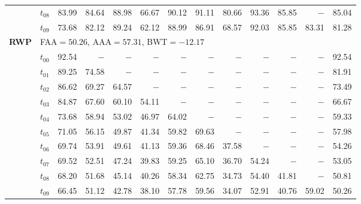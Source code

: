 \begin{table}[ht]
\begin{tabular}{@{}l l r r r r r r r r r r r@{}}
 & $t_{08}$ & 83.99 & 84.64 & 88.98 & 66.67 & 90.12 & 91.11 & 80.66 & 93.36 & 85.85 & $-$ & 85.04 \\
 & $t_{09}$ & 73.68 & 82.12 & 89.24 & 62.12 & 88.99 & 86.91 & 68.57 & 92.03 & 85.85 & 83.31 & 81.28 \\
\midrule
\multirow{11}{*}{\textbf{RWP}} & \multicolumn{12}{l}{\quad\small FAA$=50.26$,\; AAA$=57.31$,\; BWT$=-12.17$} \\
 & $t_{00}$ & 92.54 & $-$ & $-$ & $-$ & $-$ & $-$ & $-$ & $-$ & $-$ & $-$ & 92.54 \\
 & $t_{01}$ & 89.25 & 74.58 & $-$ & $-$ & $-$ & $-$ & $-$ & $-$ & $-$ & $-$ & 81.91 \\
 & $t_{02}$ & 86.62 & 69.27 & 64.57 & $-$ & $-$ & $-$ & $-$ & $-$ & $-$ & $-$ & 73.49 \\
 & $t_{03}$ & 84.87 & 67.60 & 60.10 & 54.11 & $-$ & $-$ & $-$ & $-$ & $-$ & $-$ & 66.67 \\
 & $t_{04}$ & 73.68 & 58.94 & 53.02 & 46.97 & 64.02 & $-$ & $-$ & $-$ & $-$ & $-$ & 59.33 \\
 & $t_{05}$ & 71.05 & 56.15 & 49.87 & 41.34 & 59.82 & 69.63 & $-$ & $-$ & $-$ & $-$ & 57.98 \\
 & $t_{06}$ & 69.74 & 53.91 & 49.61 & 41.13 & 59.36 & 68.46 & 37.58 & $-$ & $-$ & $-$ & 54.26 \\
 & $t_{07}$ & 69.52 & 52.51 & 47.24 & 39.83 & 59.25 & 65.10 & 36.70 & 54.24 & $-$ & $-$ & 53.05 \\
 & $t_{08}$ & 68.20 & 51.68 & 45.14 & 40.26 & 58.34 & 62.75 & 34.73 & 54.40 & 41.81 & $-$ & 50.81 \\
 & $t_{09}$ & 66.45 & 51.12 & 42.78 & 38.10 & 57.78 & 59.56 & 34.07 & 52.91 & 40.76 & 59.02 & 50.26 \\
\bottomrule
\end{tabular}
\end{table}

